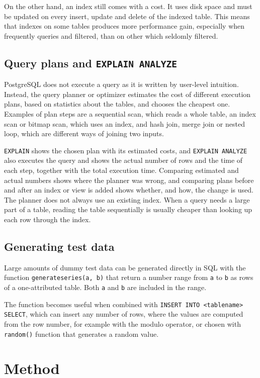 \documentclass[a4paper]{scrartcl}
\renewcommand{\_}{\textunderscore\allowbreak}
\begin{document}
On the other hand, an index still comes with a cost. It uses disk space and must be updated on every insert, update and delete of the indexed table. This means that indexes on some tables produces more performance gain, especially when frequently queries and filtered, than on other which seldomly filtered.

\subsection{Query plans and \texttt{EXPLAIN ANALYZE}}

PostgreSQL does not execute a query as it is written by user-level intuition. Instead, the query planner or optimizer estimates the cost of different execution plans, based on statistics about the tables, and chooses the cheapest one. Examples of plan steps are a sequential scan, which reads a whole table, an index scan or bitmap scan, which uses an index, and hash join, merge join or nested loop, which are different ways of joining two inputs.

\texttt{EXPLAIN} shows the chosen plan with its estimated costs, and \texttt{EXPLAIN ANALYZE} also executes the query and shows the actual number of rows and the time of each step, together with the total execution time. Comparing estimated and actual numbers shows where the planner was wrong, and comparing plans before and after an index or view is added shows whether, and how, the change is used. The planner does not always use an existing index. When a query needs a large part of a table, reading the table sequentially is usually cheaper than looking up each row through the index.

\subsection{Generating test data}

Large amounts of dummy test data can be generated directly in SQL with the function \texttt{generate\_series(a, b)} that return a number range from \texttt{a} to \texttt{b} as rows of a one-attributed table. Both \texttt{a} and \texttt{b} are included in the range.

The function becomes useful when combined with \texttt{INSERT INTO <table\_name> SELECT}, which can insert any number of rows, where the values are computed from the row number, for example with the modulo operator, or chosen with \texttt{random()} function that generates a random value.

\section{Method}
\end{document}
